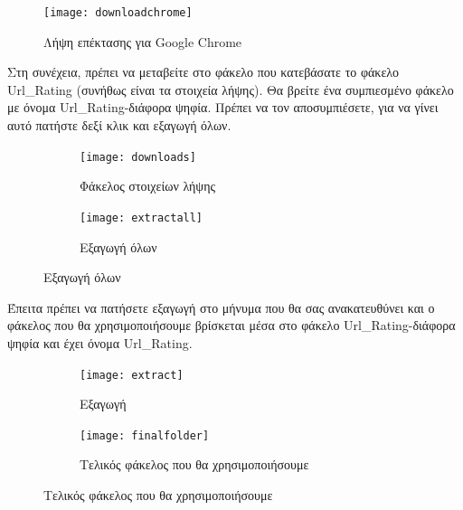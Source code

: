 \documentclass{article}
\begin{document}
\begin{figure}[H]
    \centering
    \texttt{[image: downloadchrome]}
    \caption*{Λήψη επέκτασης για Google Chrome}
\end{figure}

Στη συνέχεια, πρέπει να μεταβείτε στο φάκελο που κατεβάσατε το φάκελο Url\_Rating (συνήθως είναι τα στοιχεία λήψης). Θα βρείτε ένα συμπιεσμένο φάκελο με όνομα Url\_Rating-διάφορα ψηφία. Πρέπει να τον αποσυμπιέσετε, για να γίνει αυτό πατήστε δεξί κλικ και εξαγωγή όλων.

\begin{figure}[H]
    \centering
    \begin{minipage}[t]{0.45\textwidth}
        \centering
        \begin{subfigure}[t]{\textwidth}
            \texttt{[image: downloads]}
            \caption{Φάκελος στοιχείων λήψης}
            \label{Fig:downloads}
        \end{subfigure}
        \vspace{\fill}
    \end{minipage}
    \hfill
    \begin{minipage}{0.45\textwidth}
        \begin{subfigure}{\textwidth}
            \texttt{[image: extractall]}
            \caption{Εξαγωγή όλων}
            \label{Fig:extractall}
        \end{subfigure}
    \end{minipage}
\end{figure}

Έπειτα πρέπει να πατήσετε εξαγωγή στο μήνυμα που θα σας ανακατευθύνει και ο φάκελος που θα χρησιμοποιήσουμε βρίσκεται μέσα στο φάκελο Url\_Rating-διάφορα ψηφία και έχει όνομα Url\_Rating.

\begin{figure}[H]
    \centering
    \begin{minipage}[t]{0.45\textwidth}
        \centering
        \begin{subfigure}[t]{\textwidth}
            \texttt{[image: extract]}
            \caption{Εξαγωγή}
            \label{Fig:extract}
        \end{subfigure}
        \vspace{\fill}
    \end{minipage}
    \hfill
    \begin{minipage}{0.45\textwidth}
        \begin{subfigure}{\textwidth}
            \texttt{[image: finalfolder]}
            \caption{Τελικός φάκελος που θα χρησιμοποιήσουμε}
            \label{Fig:finalfolder}
        \end{subfigure}
    \end{minipage}
\end{figure}
\end{document}
